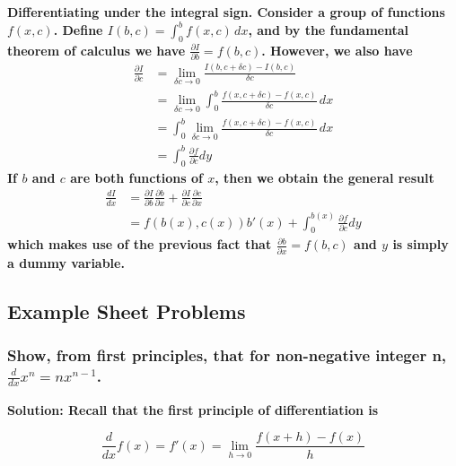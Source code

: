 \documentclass{article}
\begin{document}
\begin{theorem}
\bf Differentiating under the integral sign. \normalfont Consider a group of functions $f(x,c)$.
Define $I(b,c) = \int_{0}^{b } f(x,c) \,dx$, and by the fundamental theorem of calculus we have $\frac{\partial I}{\partial b} = f(b,c)$.
However, we also have 
\begin{equation*}
\begin{aligned}
\frac{\partial I}{\partial c} &= \lim_{\delta c \to 0} \frac{I(b, c+\delta c) - I(b,c)}{\delta c} \\
&= \lim_{\delta c \to 0} \int_{0}^{b} \frac{f(x, c+\delta c)  - f(x,c)}{\delta c}\,dx \\
&= \int_{0}^{b} \lim_{\delta c \to 0} \frac{f(x, c+\delta c)  - f(x,c)}{\delta c}\,dx \\
&= \int_{0}^{b} \frac{\partial f}{\partial c} dy
\end{aligned}
\end{equation*}
If $b$ and $c$ are both functions of $x$, then we obtain the general result
\begin{equation*}
\begin{aligned}
\frac{dI}{dx} &= \frac{\partial I}{\partial b} \frac{\partial b}{\partial x} + \frac{\partial I}{\partial c} \frac{\partial c}{\partial x} \\
&= f(b(x), c(x))b'(x) + \int_{0}^{b(x)} \frac{\partial f}{\partial c} dy
\end{aligned}
\end{equation*}
which makes use of the previous fact that $\frac{\partial b}{\partial x} = f(b,c)$ and $y$ is simply a dummy variable.
\end{theorem}

\subsection{Example Sheet Problems}

\subsubsection*{Show, from first principles, that for non-negative integer n, $\frac{d}{dx}x^n = nx^{n-1}$.}

\bf{Solution: }\normalfont Recall that the first principle of differentiation is 

\begin{equation*}
    \frac{d}{dx} f(x) = f'(x) = \lim_{h \to 0} \frac{f(x+h)-f(x)}{h}
\end{equation*}
\end{document}
